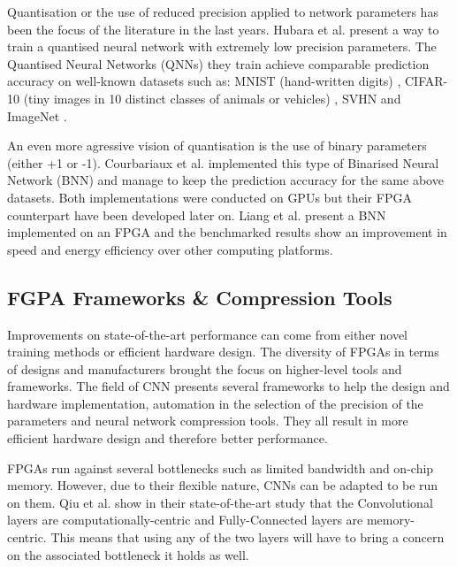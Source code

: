 Quantisation or the use of reduced precision applied to network parameters has been the focus of the literature in the last years. Hubara et al. \cite{Hubara2016} present a way to train a quantised neural network with extremely low precision parameters. The Quantised Neural Networks (QNNs) they train achieve comparable prediction accuracy on well-known datasets such as: MNIST (hand-written digits) \cite{LeCun2010}, CIFAR-10 (tiny images in 10 distinct classes of animals or vehicles) \cite{Krizhevsky2012}, SVHN \cite{Netzer2011} and ImageNet \cite{ImageNet2009}.

An even more agressive vision of quantisation is the use of binary parameters (either +1 or -1). Courbariaux et al. \cite{Courbariaux2016} implemented this type of Binarised Neural Network (BNN) and manage to keep the prediction accuracy for the same above datasets. Both implementations were conducted on GPUs but their FPGA counterpart have been developed later on. Liang et al. \cite{Liang2017} present a BNN implemented on an FPGA and the benchmarked results show an improvement in speed and energy efficiency over other computing platforms.


\subsection{FGPA Frameworks \& Compression Tools}

Improvements on state-of-the-art performance can come from either novel training methods or efficient hardware design. The diversity of FPGAs in terms of designs and manufacturers brought the focus on higher-level tools and frameworks. The field of CNN presents several frameworks to help the design and hardware implementation, automation in the selection of the precision of the parameters and neural network compression tools. They all result in more efficient hardware design and therefore better performance.

FPGAs run against several bottlenecks such as limited bandwidth and on-chip memory. However, due to their flexible nature, CNNs can be adapted to be run on them. Qiu et al. \cite{Qiu2016} show in their state-of-the-art study that the Convolutional layers are computationally-centric and Fully-Connected layers are memory-centric. This means that using any of the two layers will have to bring a concern on the associated bottleneck it holds as well.

